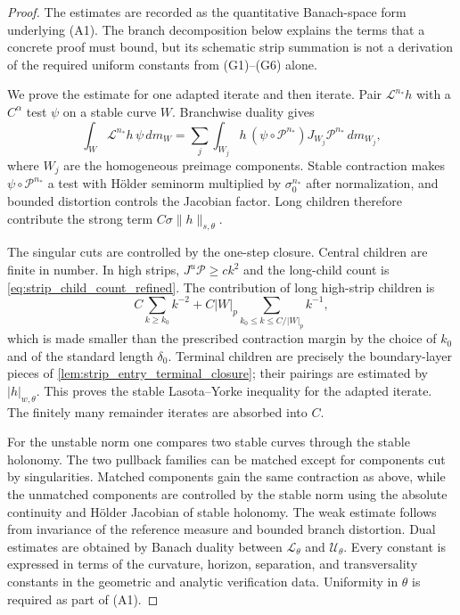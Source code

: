 \documentclass[12pt, letterpaper]{amsart}
\newcommand{\Pcal}{\mathcal{P}}
\theoremstyle{plain}
\theoremstyle{definition}
\theoremstyle{remark}
\begin{document}
\begin{proof}
The estimates are recorded as the quantitative Banach-space form underlying
\textup{(A1)}.  The branch decomposition below explains the terms that a
concrete proof must bound, but its schematic strip summation is not a derivation
of the required uniform constants from \textup{(G1)--(G6)} alone.

We prove the estimate for one adapted iterate and then iterate.  Pair
$\mathscr{L}^{n_*}h$ with a $C^\alpha$ test $\psi$ on a stable curve $W$.
Branchwise duality gives
\begin{equation}
    \int_W \mathscr{L}^{n_*}h\,\psi\,dm_W
    =\sum_j\int_{W_j} h\, (\psi\circ \Pcal^{n_*}) J_{W_j}\Pcal^{n_*}\,dm_{W_j},
\end{equation}
where $W_j$ are the homogeneous preimage components.  Stable contraction makes
$\psi\circ\Pcal^{n_*}$ a test with H\"older seminorm multiplied by
$\sigma_0^{n_*}$ after normalization, and bounded distortion controls the
Jacobian factor.  Long children therefore contribute the strong term
$C\sigma\|h\|_{s,\theta}$.

The singular cuts are controlled by the one-step closure.  Central children are
finite in number.  In high strips, $J^u\Pcal\ge ck^2$ and the long-child count
is \eqref{eq:strip_child_count_refined}.  The contribution of long high-strip
children is
\begin{equation}
    C\sum_{k\ge k_0}k^{-2}+C|W|_p\sum_{k_0\le k\le C/|W|_p}k^{-1},
\end{equation}
which is made smaller than the prescribed contraction margin by the choice of
$k_0$ and of the standard length $\delta_0$.  Terminal children are precisely
the boundary-layer pieces of \cref{lem:strip_entry_terminal_closure}; their
pairings are estimated by $|h|_{w,\theta}$.  This proves the stable
Lasota--Yorke inequality for the adapted iterate.  The finitely many remainder
iterates are absorbed into $C$.

For the unstable norm one compares two stable curves through the stable
holonomy.  The two pullback families can be matched except for components cut by
singularities.  Matched components gain the same contraction as above, while the
unmatched components are controlled by the stable norm using the absolute
continuity and H\"older Jacobian of stable holonomy.  The weak estimate follows
from invariance of the reference measure and bounded branch distortion.  Dual
estimates are obtained by Banach duality between $\mathscr{L}_\theta$ and
$\mathscr{U}_\theta$.  Every constant is expressed in terms of the curvature,
horizon, separation, and transversality constants in
    the geometric and analytic verification data.  Uniformity in $\theta$ is
    required as part of \textup{(A1)}.
\end{proof}
\end{document}
